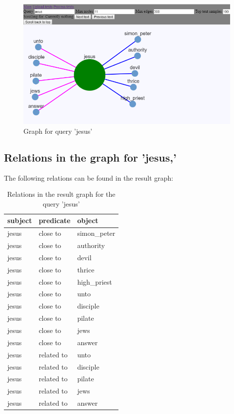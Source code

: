 \begin{figure}[H]
    \centering
    \includegraphics[scale=0.9]{fig/jesus}
    \caption{Graph for query 'jesus'}
    \label{fig:query_jesus}
\end{figure}

\clearpage
\subsection{Relations in the graph for 'jesus,'}
The following relations can be found in the result graph:
\begin{table}[H]
\centering
    \begin{tabular}{|l|l|l|}
    \hline
    subject & predicate & object \\
    \hline
    jesus &close to& simon\_peter \\
    jesus &close to& authority \\
    jesus &close to& devil \\
    jesus &close to& thrice\\
    jesus &close to& high\_priest \\
    \hline
    jesus &close to& unto\\
    jesus &close to& disciple\\
    jesus &close to& pilate\\
    jesus &close to& jews\\
    jesus &close to& answer\\
    \hline
    jesus &related to & unto\\
    jesus &related to & disciple\\
    jesus &related to & pilate\\
    jesus &related to & jews\\
    jesus &related to & answer\\
    \hline
\end{tabular}
\caption{Relations in the result graph for the query 'jesus'}
\label{tab:relations_jesus}
\end{table}

